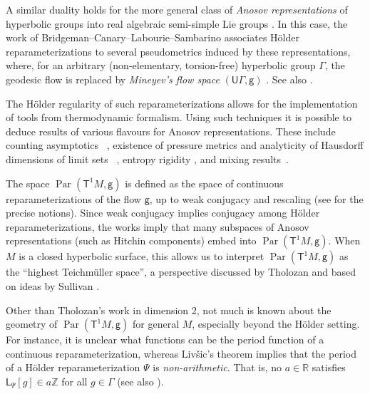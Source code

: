 \documentclass[twoside]{amsart}
\theoremstyle{definition}
\numberwithin{equation}{section}
\numberwithin{theorem}{section}
\newcommand{\msf}[1]{\mathsf{#1}}
\newcommand{\R}{\mathbb{R}}
\newcommand{\Z}{\mathbb{Z}}
\newcommand{\G}{\Gamma}
\DeclareMathOperator{\Par}{Par}
\newcommand{\UG}{\msf{U}\G}
\newcommand{\sfP}{\mathsf{\Psi}}
\begin{document}
A similar duality holds for the more general class of \emph{Anosov representations} of hyperbolic groups into real algebraic semi-simple Lie groups \cite{labourie.anosov,guichard-wienhard}. In this case, the work of Bridgeman--Canary--Labourie--Sambarino \cite{BCLS.pressure,BCLS.rootflows} associates H\"older reparameterizations to several pseudometrics induced by these representations, where, for an arbitrary (non-elementary, torsion-free) hyperbolic group $\G$, the geodesic flow is replaced by \emph{Mineyev's flow space} $(\UG,\msf{g})$ \cite{gromov.hypgroups,mineyev.flow}. See also .

The H\"older regularity of such reparameterizations allows for the implementation of tools from thermodynamic formalism. Using such techniques it is possible to deduce results of various flavours for Anosov representations. These include counting asymptotics ~\cite{sambarino.quantitative,sambarino.orbital}, existence of pressure metrics and analyticity of Hausdorff dimensions of limit sets ~\cite{BCLS.pressure,BCLS.rootflows}, entropy rigidity \cite{PS17:Entropy}, and mixing results~\cite{sambarino.orbital,chow-sarkar.local,chow-sarkar.exp,DMS.I}. 

The space $\Par(\msf{T}^1M,\msf{g})$ is defined as the space of continuous reparameterizations of the flow $\msf{g}$, up to weak conjugacy and rescaling (see  for the precise notions). Since weak conjugacy implies conjugacy among H\"older reparameterizations, the works \cite{BCLS.pressure,CDPW} imply that many subspaces of Anosov representations (such as Hitchin components) embed into $\Par(\msf{T}^1M,\msf{g})$. When $M$ is a closed hyperbolic surface, this allows us to interpret $\Par(\msf{T}^1 M,\msf{g})$ as the  ``highest Teichm\"uller space'', a perspective discussed by Tholozan \cite{tholozan} and based on ideas by Sullivan \cite{Sullivan91:LinkingUniversalities}. 

Other than Tholozan's work in dimension 2, not much is known about the geometry of $\Par(\msf{T}^1M,\msf{g})$ for general $M$, especially beyond the H\"older setting. For instance, it is unclear what functions can be the period function of a continuous reparameterization, whereas Liv\v{s}ic's theorem implies that the period of a H\"older reparameterization $\sfP$ is \emph{non-arithmetic}. That is, no $a\in \R$ satisfies $\msf{L}_{\sfP}[g]\in a\Z$ for all $g\in \G$ (see also ). 
\end{document}
